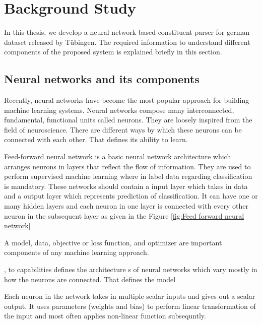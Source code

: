 \documentclass[a4paper, 11pt]{article}
\begin{document}




\pagebreak
\section{Background Study}
In this thesis, we develop a neural network based constituent parser for german dataset released by Tübingen. The required information to understand different components of the proposed system is explained briefly in this section. 

\subsection{Neural networks and its components}

Recently, neural networks have become the most popular approach for building machine learning systems. Neural networks compose many interconnected, fundamental, functional units called neurons. They are loosely inspired from the field of neuroscience. There are different ways by which these neurons can be connected with each other. That defines its ability to learn. 

Feed-forward neural network \parencite{Svozil1997} is a basic neural network architecture which arranges neurons in layers that reflect the flow of information. They are used to perform supervised machine learning where in label data regarding classification is mandatory. These networks should contain a input layer which takes in data and a output layer which represents prediction of classification. It can have one or many hidden layers and each neuron in one layer is connected with every other neuron in the subsequent layer as given in the Figure \ref{fig:Feed forward neural network}

A model, data, objective or loss function, and optimizer are important components of any machine learning approach.

,  to capabilities defines the architecture s of neural networks which vary mostly in how the neurons are connected. That defines the model

Each neuron in the network takes in multiple scalar inputs and gives out a scalar output. It uses parameters (weights and bias) to perform linear transformation of the input and most often applies non-linear function subsequntly.
\end{document}
